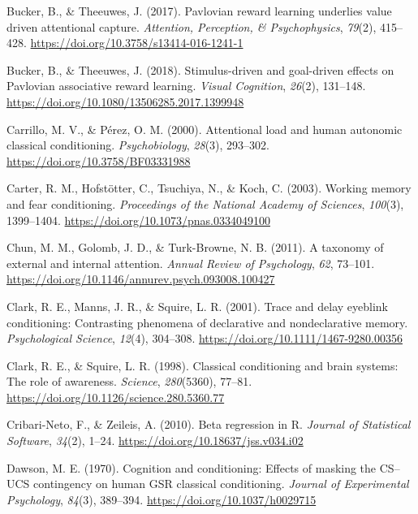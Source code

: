 \documentclass[
  man,
  floatsintext,
  longtable,
  nolmodern,
  notxfonts,
  notimes,
  mask,
  colorlinks=true,linkcolor=blue,citecolor=blue,urlcolor=blue]{apa7}
\newlength{\cslhangindent}
\newenvironment{CSLReferences}[2] %
 {\begin{list}{}{%
  \setlength{\itemindent}{0pt}
  \setlength{\leftmargin}{0pt}
  \setlength{\parsep}{0pt}
  \ifodd #1
   \setlength{\leftmargin}{\cslhangindent}
   \setlength{\itemindent}{-1\cslhangindent}
  \fi
  \setlength{\itemsep}{#2\baselineskip}}}
 {\end{list}}
\begin{document}
\begin{CSLReferences}{1}{0}
Bucker, B., \& Theeuwes, J. (2017). Pavlovian reward learning underlies
value driven attentional capture. \emph{Attention, Perception, \&
Psychophysics}, \emph{79}(2), 415--428.
\url{https://doi.org/10.3758/s13414-016-1241-1}

Bucker, B., \& Theeuwes, J. (2018). Stimulus-driven and goal-driven
effects on {Pavlovian} associative reward learning. \emph{Visual
Cognition}, \emph{26}(2), 131--148.
\url{https://doi.org/10.1080/13506285.2017.1399948}

Carrillo, M. V., \& Pérez, O. M. (2000). Attentional load and human
autonomic classical conditioning. \emph{Psychobiology}, \emph{28}(3),
293--302. \url{https://doi.org/10.3758/BF03331988}

Carter, R. M., Hofstötter, C., Tsuchiya, N., \& Koch, C. (2003). Working
memory and fear conditioning. \emph{Proceedings of the National Academy
of Sciences}, \emph{100}(3), 1399--1404.
\url{https://doi.org/10.1073/pnas.0334049100}

Chun, M. M., Golomb, J. D., \& Turk-Browne, N. B. (2011). A taxonomy of
external and internal attention. \emph{Annual Review of Psychology},
\emph{62}, 73--101.
\url{https://doi.org/10.1146/annurev.psych.093008.100427}

Clark, R. E., Manns, J. R., \& Squire, L. R. (2001). Trace and delay
eyeblink conditioning: Contrasting phenomena of declarative and
nondeclarative memory. \emph{Psychological Science}, \emph{12}(4),
304--308. \url{https://doi.org/10.1111/1467-9280.00356}

Clark, R. E., \& Squire, L. R. (1998). Classical conditioning and brain
systems: The role of awareness. \emph{Science}, \emph{280}(5360),
77--81. \url{https://doi.org/10.1126/science.280.5360.77}

Cribari-Neto, F., \& Zeileis, A. (2010). Beta regression in {R}.
\emph{Journal of Statistical Software}, \emph{34}(2), 1--24.
\url{https://doi.org/10.18637/jss.v034.i02}

Dawson, M. E. (1970). Cognition and conditioning: Effects of masking the
{CS}--{UCS} contingency on human {GSR} classical conditioning.
\emph{Journal of Experimental Psychology}, \emph{84}(3), 389--394.
\url{https://doi.org/10.1037/h0029715}


\end{CSLReferences}
\end{document}
